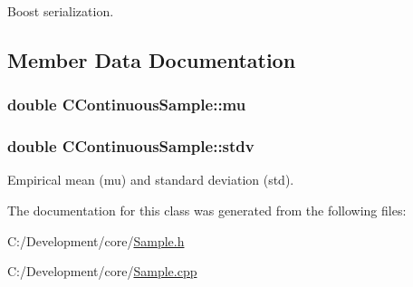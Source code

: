 Boost serialization. 



\subsection{Member Data Documentation}
\hypertarget{class_c_continuous_sample_a1e4e0d9a75c4111d5c5c3bc67ded57bb}{
\subsubsection[{mu}]{\setlength{\rightskip}{0pt plus 5cm}double C\-Continuous\-Sample\-::mu\hspace{0.3cm}{\ttfamily [protected]}}}\label{class_c_continuous_sample_a1e4e0d9a75c4111d5c5c3bc67ded57bb}
\hypertarget{class_c_continuous_sample_a5ccdb718bac3e945f5e593d0137717e0}{
\subsubsection[{stdv}]{\setlength{\rightskip}{0pt plus 5cm}double C\-Continuous\-Sample\-::stdv\hspace{0.3cm}{\ttfamily [protected]}}}\label{class_c_continuous_sample_a5ccdb718bac3e945f5e593d0137717e0}
Empirical mean (mu) and standard deviation (std). 

The documentation for this class was generated from the following files\-:\begin{DoxyCompactItemize}
\item 
C\-:/\-Development/core/\hyperlink{_sample_8h}{Sample.\-h}\item 
C\-:/\-Development/core/\hyperlink{_sample_8cpp}{Sample.\-cpp}\end{DoxyCompactItemize}
